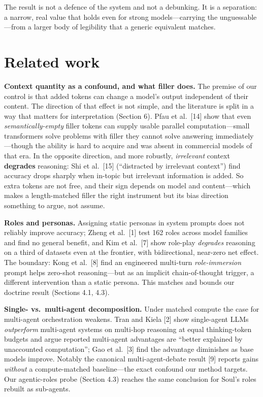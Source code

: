 \documentclass[11pt]{article}
\begin{document}
The result is not a defence of the system and not a debunking. It is a separation: a
narrow, real value that holds even for strong models---carrying the unguessable---from a
larger body of legibility that a generic equivalent matches.

\section{Related work}

\textbf{Context quantity as a confound, and what filler does.} The premise of our control is
that added tokens can change a model's output independent of their content. The
direction of that effect is not simple, and the literature is split in a way that
matters for interpretation (Section 6). Pfau et al.\ [14] show that even
\emph{semantically-empty} filler tokens can supply usable parallel computation---small
transformers solve problems with filler they cannot solve answering immediately---though
the ability is hard to acquire and was absent in commercial models of that era. In the
opposite direction, and more robustly, \emph{irrelevant} context \textbf{degrades} reasoning: Shi
et al.\ [15] (``distracted by irrelevant context'') find accuracy drops sharply when
in-topic but irrelevant information is added. So extra tokens are not free, and their
sign depends on model and content---which makes a length-matched filler the right
instrument but its bias direction something to argue, not assume.

\textbf{Roles and personas.} Assigning static personas in system prompts does not reliably
improve accuracy; Zheng et al.\ [1] test 162 roles across model families and find no
general benefit, and Kim et al.\ [7] show role-play \emph{degrades} reasoning on a third of
datasets even at the frontier, with bidirectional, near-zero net effect. The boundary:
Kong et al.\ [8] find an engineered multi-turn \emph{role-immersion} prompt helps zero-shot
reasoning---but as an implicit chain-of-thought trigger, a different intervention than
a static persona. This matches and bounds our doctrine result (Sections 4.1, 4.3).

\textbf{Single- vs.\ multi-agent decomposition.} Under matched compute the case for
multi-agent orchestration weakens. Tran and Kiela [2] show single-agent LLMs \emph{outperform}
multi-agent systems on multi-hop reasoning at equal thinking-token budgets and argue
reported multi-agent advantages are ``better explained by unaccounted computation''; Gao
et al.\ [3] find the advantage diminishes as base models improve. Notably the canonical
multi-agent-debate result [9] reports gains \emph{without} a compute-matched baseline---the
exact confound our method targets. Our agentic-roles probe (Section 4.3) reaches the
same conclusion for Soul's roles rebuilt as sub-agents.
\end{document}
